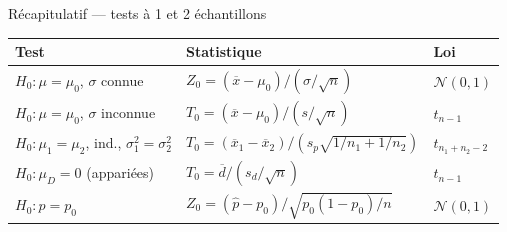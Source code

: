 \documentclass{BeamerTemplate}
\begin{document}
\begin{frame}[t]{Récapitulatif — tests à 1 et 2 échantillons}

\begin{center}
\small
\begin{tabular}{lll}\hline
\textbf{Test} & \textbf{Statistique} & \textbf{Loi} \\ \hline
$H_0:\mu=\mu_0$, $\sigma$ connue & $Z_0=(\overline{x}-\mu_0)/(\sigma/\sqrt{n})$ & $\mathcal{N}(0,1)$ \\[3pt]
$H_0:\mu=\mu_0$, $\sigma$ inconnue & $T_0=(\overline{x}-\mu_0)/(s/\sqrt{n})$ & $t_{n-1}$ \\[3pt]
$H_0:\mu_1=\mu_2$, ind., $\sigma_1^2=\sigma_2^2$ & $T_0=(\overline{x}_1-\overline{x}_2)/(s_p\sqrt{1/n_1+1/n_2})$ & $t_{n_1+n_2-2}$ \\[3pt]
$H_0:\mu_D=0$ (appariées) & $T_0=\overline{d}/(s_d/\sqrt{n})$ & $t_{n-1}$ \\[3pt]
$H_0:p=p_0$ & $Z_0=(\hat{p}-p_0)/\sqrt{p_0(1-p_0)/n}$ & $\mathcal{N}(0,1)$ \\ \hline
\end{tabular}
\end{center}

\end{frame}
\end{document}
